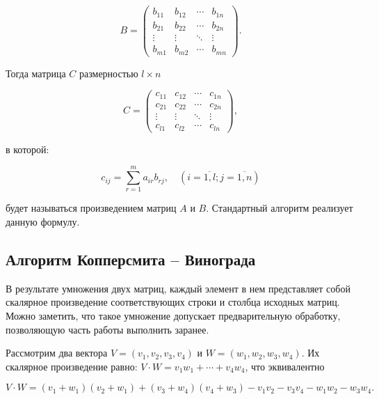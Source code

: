 \begin{equation}
    B =
    \begin{pmatrix}
      b_{11} & b_{12} & \cdots & b_{1n} \\
      b_{21} & b_{22} & \cdots & b_{2n} \\
      \vdots & \vdots & \ddots & \vdots \\
      b_{m1} & b_{m2} & \cdots & b_{mn}
    \end{pmatrix}.
\end{equation}

Тогда матрица $C$ размерностью $l \times n$

\begin{equation}
    C =
      \begin{pmatrix}
        c_{11} & c_{12} & \cdots & c_{1n} \\
        c_{21} & c_{22} & \cdots & c_{2n} \\
        \vdots & \vdots & \ddots & \vdots \\
        c_{l1} & c_{l2} & \cdots & c_{ln}
      \end{pmatrix},
\end{equation}

в которой:

\begin{equation}
    \displaystyle
    c_{ij} = \displaystyle\sum_{r = 1}^{m} a_{ir} b_{rj}, \quad (i = \overline{1, l}; j = \overline{1, n} )
\end{equation}

будет называться произведением матриц $A$ и $B$. Стандартный алгоритм
реализует данную формулу.

\subsection{Алгоритм Копперсмита -- Винограда}

В результате умножения двух матриц, каждый элемент в нем представляет собой скалярное произведение соответствующих строки и столбца исходных матриц. Можно заметить, что такое умножение допускает предварительную обработку, позволяющую часть работы выполнить заранее.

Рассмотрим два вектора $V = (v_1, v_2, v_3, v_4)$ и $W = (w_1, w_2, w_3, w_4)$. Их скалярное произведение равно: $V \cdot W = v_1 w_1 + \cdots + v_4 w_4$, что эквивалентно

\begin{equation}
    V \cdot W = (v_1 + w_1)(v_2 + w_1) + (v_3 + w_4)(v_4 + w_3) - v_1 v_2 - v_3 v_4 - w_1 w_2 - w_3 w_4.
\end{equation}

